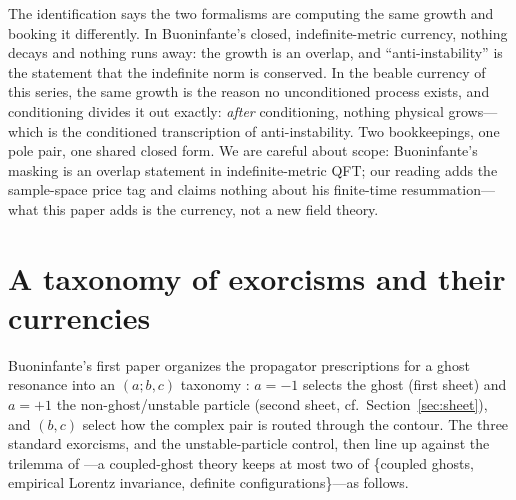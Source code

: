 \documentclass[11pt]{article}
\theoremstyle{definition}
\theoremstyle{remark}
\begin{document}
The identification says the two formalisms are computing the same
growth and booking it differently. In Buoninfante's closed,
indefinite-metric currency, nothing decays and nothing runs away:
the growth is an overlap, and ``anti-instability'' is the statement
that the indefinite norm is conserved. In the beable currency of this
series, the same growth is the reason no unconditioned process
exists, and conditioning divides it out exactly: \emph{after}
conditioning, nothing physical grows---which is the conditioned
transcription of anti-instability. Two bookkeepings, one pole pair,
one shared closed form. We are careful about scope: Buoninfante's
masking is an overlap statement in indefinite-metric QFT; our reading
adds the sample-space price tag and claims nothing about his
finite-time resummation---what this paper adds is the currency, not a
new field theory.

\section{A taxonomy of exorcisms and their currencies}
\label{sec:taxonomy}

Buoninfante's first paper organizes the propagator prescriptions for
a ghost resonance into an $(a;b,c)$ taxonomy
\cite[Eqs.~(5)--(6)]{BuoninfanteP1}: $a=-1$ selects the ghost (first
sheet) and $a=+1$ the non-ghost/unstable particle (second sheet, cf.\
Section~\ref{sec:sheet}), and $(b,c)$ select how the complex pair is
routed through the contour. The three standard exorcisms, and the
unstable-particle control, then line up against the trilemma of
\cite{choosing}---a coupled-ghost theory keeps at most two of
\{coupled ghosts, empirical Lorentz invariance, definite
configurations\}---as follows.
\end{document}
